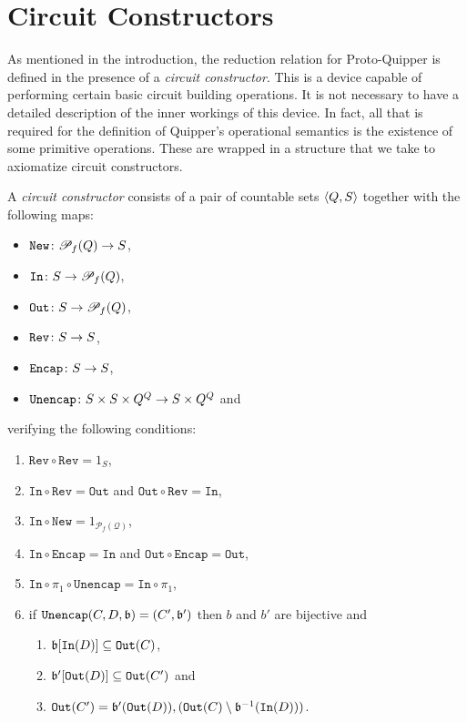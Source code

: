 \documentclass{article}
\begin{document}
\section{Circuit Constructors}

As mentioned in the introduction, the reduction relation for 
Proto-Quipper is defined in the presence of a \emph{circuit
constructor}. This is a device capable of 
performing certain basic circuit building operations. It is 
not necessary to have a detailed description of the inner 
workings of this device. In fact, all that is required for 
the definition of Quipper's operational semantics is the 
existence of some primitive operations. These are wrapped 
in a structure that we take to axiomatize circuit constructors. 

\begin{definition}
\label{circuit_constructor}
A \emph{circuit constructor} consists of a pair of countable sets $\langle Q,S\rangle$ 
together with the following maps:
\begin{itemize}
  \item $\mathtt{New}\colon {\mathscr{P}}_f(Q) \to S$,
  \item $\mathtt{In}\colon S\to {\mathscr{P}}_f(Q)$,
  \item $\mathtt{Out}\colon S\to {\mathscr{P}}_f(Q)$,
  \item $\mathtt{Rev}\colon S \to S$,
  \item $\mathtt{Encap}\colon S \to  S$,
  \item $\mathtt{Unencap}\colon S\times S\times Q^Q \to S \times Q^Q$ and
\end{itemize}
verifying the following conditions:
\begin{enumerate}
  \item $\mathtt{Rev}\circ\mathtt{Rev}=1_S$,
  \item $\mathtt{In}\circ\mathtt{Rev}= \mathtt{Out}$ and 
        $\mathtt{Out}\circ\mathtt{Rev}= \mathtt{In}$\label{in_out_rev},
  \item $\mathtt{In}\circ\mathtt{New} =1_{\mathcal{P}_f(\mathcal{Q})}$,
  \item $\mathtt{In}\circ \mathtt{Encap} =\mathtt{In}$ and $\mathtt{Out}\circ \mathtt{Encap} =\mathtt{Out}$,
  \item $\mathtt{In}\circ\pi_1\circ\mathtt{Unencap}=\mathtt{In}\circ\pi_1$,\label{Unencap_In}
  \item if $\mathtt{Unencap} (C,D,\mathfrak{b})=(C',\mathfrak{b}')$ then $b$ and $b'$ are bijective and\label{Unencap_cond}
    \begin{enumerate}
      \item $\mathfrak{b}[\mathtt{In}(D)]\subseteq \mathtt{Out} (C)$,\label{Unencap_cond_1}
      \item $\mathfrak{b}'[\mathtt{Out}(D)]\subseteq\mathtt{Out}(C')$ and\label{Unencap_cond_2}
      \item $\mathtt{Out}(C')=\mathfrak{b}'(\mathtt{Out}(D)),(\mathtt{Out}(C)\setminus\mathfrak{b}^{-1}(\mathtt{In}(D)))$.\label{Unencap_cond_3}
    \end{enumerate}
\end{enumerate}
\end{definition}
\end{document}
